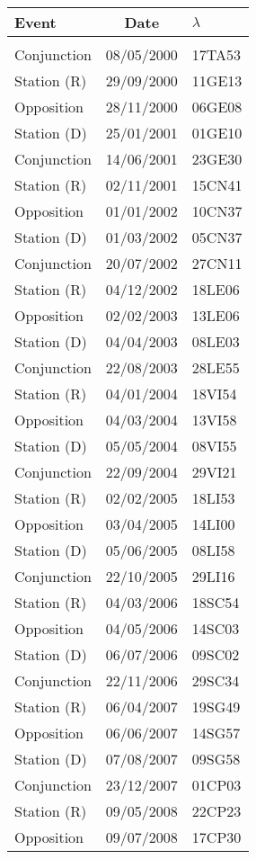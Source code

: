 \newpage
\begin{table}\centering
{\small\begin{tabular}{lcl}
Event & Date & $\lambda$ \\\hline
&&\\[-1.75ex]
Conjunction & 08/05/2000 & 17TA53\\
Station (R) & 29/09/2000 & 11GE13\\
Opposition & 28/11/2000 & 06GE08\\
Station (D) & 25/01/2001 & 01GE10\\
Conjunction & 14/06/2001 & 23GE30\\
Station (R) & 02/11/2001 & 15CN41\\
Opposition & 01/01/2002 & 10CN37\\
Station (D) & 01/03/2002 & 05CN37\\
Conjunction & 20/07/2002 & 27CN11\\
Station (R) & 04/12/2002 & 18LE06\\
Opposition & 02/02/2003 & 13LE06\\
Station (D) & 04/04/2003 & 08LE03\\
Conjunction & 22/08/2003 & 28LE55\\
Station (R) & 04/01/2004 & 18VI54\\
Opposition & 04/03/2004 & 13VI58\\
Station (D) & 05/05/2004 & 08VI55\\
Conjunction & 22/09/2004 & 29VI21\\
Station (R) & 02/02/2005 & 18LI53\\
Opposition & 03/04/2005 & 14LI00\\
Station (D) & 05/06/2005 & 08LI58\\
Conjunction & 22/10/2005 & 29LI16\\
Station (R) & 04/03/2006 & 18SC54\\
Opposition & 04/05/2006 & 14SC03\\
Station (D) & 06/07/2006 & 09SC02\\
Conjunction & 22/11/2006 & 29SC34\\
Station (R) & 06/04/2007 & 19SG49\\
Opposition & 06/06/2007 & 14SG57\\
Station (D) & 07/08/2007 & 09SG58\\
Conjunction & 23/12/2007 & 01CP03\\
Station (R) & 09/05/2008 & 22CP23\\
Opposition & 09/07/2008 & 17CP30\\

\end{tabular}}
\end{table}
